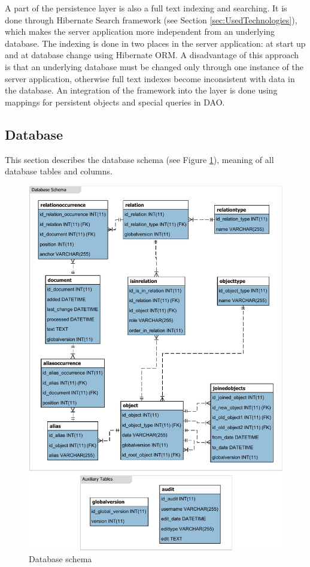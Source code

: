 A part of the persistence layer is also a full text indexing and searching. It is
done through Hibernate Search framework (see Section \ref{sec:UsedTechnologies}),
which makes the server application more independent from an underlying database.
The indexing is done in two places in the server application: at start up and at
database change using Hibernate ORM. A disadvantage of this approach is that
an underlying database must be changed only through one instance of the server
application, otherwise full text indexes become inconsistent with data in the database.
An integration of the framework into the layer is done using mappings for persistent
objects and special queries in DAO.

\subsection{Database}
\label{sec:Database}

This section describes the database schema (see Figure \ref{fig:DatabaseSchema}),
meaning of all database tables and columns.

\begin{figure}[!hp]
        \centering
        \includegraphics{Images/DatabaseSchema}
        \caption{Database schema}
        \label{fig:DatabaseSchema}
\end{figure}

